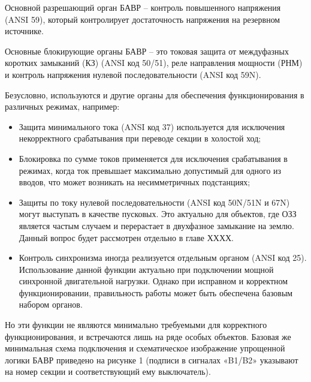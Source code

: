 Основной разрешающий орган БАВР – контроль повышенного напряжения (ANSI 59), который
контролирует достаточность напряжения на резервном источнике.\par\vspace{0.2cm}

Основные блокирующие органы БАВР – это токовая защита от междуфазных коротких замыканий
(КЗ) (ANSI код 50/51), реле направления мощности (РНМ) и контроль напряжения нулевой
последовательности (ANSI код 59N).\par\vspace{0.2cm}

Безусловно, используются и другие органы для обеспечения функционирования в различных
режимах, например:\par\vspace{0.2cm}

\begin{itemize}
  \item Защита минимального тока (ANSI код 37) используется для исключения некорректного срабатывания при переводе секции в холостой ход;
  \item Блокировка по сумме токов применяется для исключения срабатывания в режимах, когда ток превышает максимально допустимый для одного из вводов, что может возникать на несимметричных подстанциях;
  \item Защиты по току нулевой последовательности (ANSI код 50N/51N и 67N) могут выступать в качестве пусковых. Это актуально для объектов, где ОЗЗ является частым случаем и перерастает в двухфазное замыкание на землю. Данный вопрос будет рассмотрен отдельно в главе ХХХХ.
  \item Контроль синхронизма иногда реализуется отдельным органом (ANSI код 25). Использование данной функции актуально при подключении мощной синхронной двигательной нагрузки. Однако при исправном и корректном функционировании, правильность работы может быть обеспечена базовым набором органов.
\end{itemize}

Но эти функции не являются минимально требуемыми для корректного функционирования, и
встречаются лишь на ряде особых объектов. Базовая же минимальная схема подключения и
схематическое изображение упрощенной логики БАВР приведено на рисунке 1 (подписи в
сигналах «B1/B2» указывают на номер секции и соответствующий ему
выключатель).\par\vspace{0.3cm}

